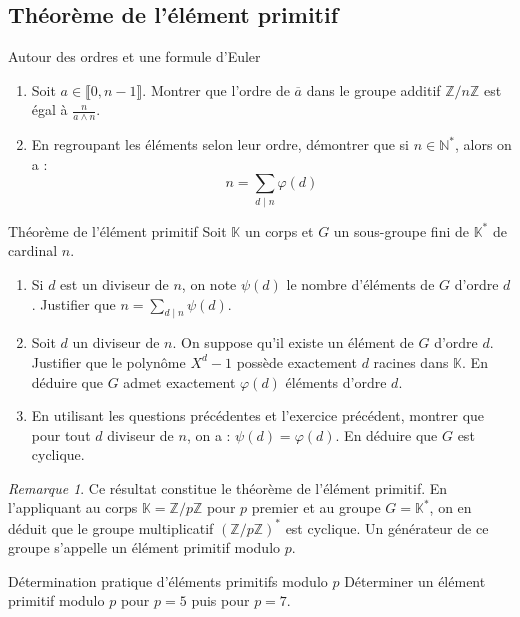 \documentclass[french,a4paper]{article}
\newcommand{\N}{\mathbb{N}}
\newcommand{\Z}{\mathbb{Z}}
\newcommand{\K}{\mathbb{K}}
\newcommand{\st}{^*}
\theoremstyle{plain}
\theoremstyle{definition}
\theoremstyle{remark}
\newtheorem*{rmq}{Remarque}
\begin{document}
\subsection{Théorème de l'élément primitif}
\begin{ex}{Autour des ordres et une formule d'Euler}
	\begin{enumerate}
		\item Soit $a\in\llbracket0,n-1\rrbracket$. Montrer que l'ordre de $\overline{a}$ dans le groupe additif $\Z/n\Z$ est égal à $\displaystyle\frac{n}{a\wedge n}$.
		\item En regroupant les éléments selon leur ordre, démontrer que si $n\in\N\st$, alors on a : $$n=\sum_{d\mid n}\varphi(d)$$
	\end{enumerate}
\end{ex}
\begin{ex}{Théorème de l'élément primitif}
	Soit $\K$ un corps et $G$ un sous-groupe fini de $\K\st$ de cardinal $n$.
	\begin{enumerate}
		\item Si $d$ est un diviseur de $n$, on note $\psi(d)$ le nombre d'éléments de $G$ d'ordre $d$. Justifier que $n=\displaystyle\sum_{d\mid n}\psi(d)$.
		\item Soit $d$ un diviseur de $n$. On suppose qu'il existe un élément de $G$ d'ordre $d$. Justifier que le polynôme $X^d-1$ possède exactement $d$ racines dans $\K$. En déduire que $G$ admet exactement $\varphi(d)$ éléments d'ordre $d$.
		\item En utilisant les questions précédentes et l'exercice précédent, montrer que pour tout $d$ diviseur de $n$, on a : $\psi(d)=\varphi(d)$. En déduire que $G$ est cyclique.
	\end{enumerate}
\end{ex}
\begin{rmq}
	Ce résultat constitue le théorème de l'élément primitif. En l'appliquant au corps $\K=\Z/p\Z$ pour $p$ premier et au groupe $G=\K\st$, on en déduit que le groupe multiplicatif $(\Z/p\Z)\st$ est cyclique. Un générateur de ce groupe s'appelle un élément primitif modulo $p$.
\end{rmq}
\begin{ex}{Détermination pratique d'éléments primitifs modulo $p$}
	Déterminer un élément primitif modulo $p$ pour $p=5$ puis pour $p=7$.
\end{ex}
\end{document}
